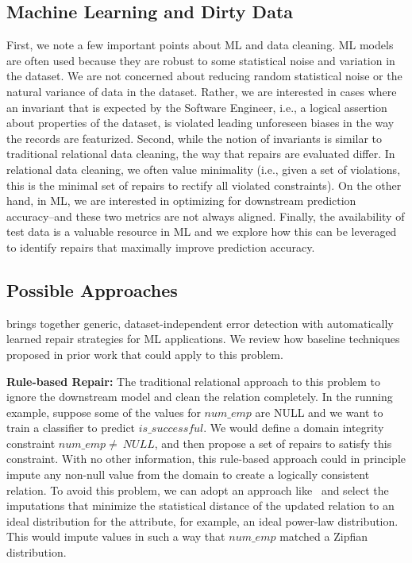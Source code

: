 \subsection{Machine Learning and Dirty Data}
First, we note a few important points about ML and data cleaning.
ML models are often used because they are robust to some statistical noise and variation in the dataset.
We are not concerned about reducing random statistical noise or the natural variance of data in the dataset.
Rather, we are interested in cases where an invariant that is expected by the Software Engineer, i.e., a logical assertion about properties of the dataset, is violated leading unforeseen biases in the way the records are featurized.
Second, while the notion of invariants is similar to traditional relational data cleaning, the way that repairs are evaluated differ.
In relational data cleaning, we often value minimality (i.e., given a set of violations, this is the minimal set of repairs to rectify all violated constraints).
On the other hand, in ML, we are interested in optimizing for downstream prediction accuracy--and these two metrics are not always aligned.
Finally, the availability of test data is a valuable resource in ML and we explore how this can be leveraged to identify repairs that maximally improve prediction accuracy.

\subsection{Possible Approaches}
\sys brings together generic, dataset-independent error detection with automatically learned repair strategies for ML applications.
We review how baseline techniques proposed in prior work that could apply to this problem.

\vspace{0.5em}

\noindent\textbf{Rule-based Repair: } 
The traditional relational approach to this problem to ignore the downstream model and clean the relation completely.
In the running example, suppose some of the values for $num\_emp$ are NULL and we want to train a classifier to predict $is\_successful$.
We would define a domain integrity constraint $num\_emp \ne~NULL$, and then propose a set of repairs to satisfy this constraint.
With no other information, this rule-based approach could in principle impute any non-null value from the domain to create a logically consistent relation.
To avoid this problem, we can adopt an approach like~\cite{prokoshyna2015combining} and select the imputations that minimize the statistical distance of the updated relation to an ideal distribution for the attribute, for example, an ideal power-law distribution.
This would impute values in such a way that $num\_emp$ matched a Zipfian distribution.

